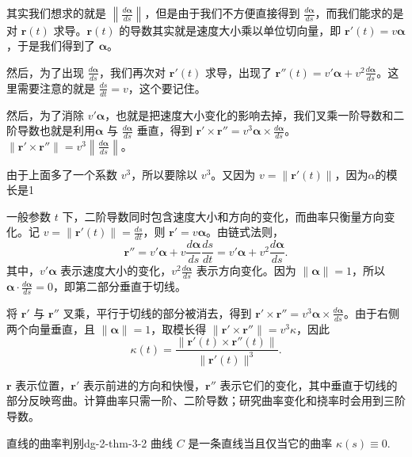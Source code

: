 \begin{dxtips}
   其实我们想求的就是 $\left\|\frac{d\boldsymbol\alpha}{ds}\right\|$，但是由于我们不方便直接得到 $\frac{d\boldsymbol\alpha}{ds}$，而我们能求的是对 $\boldsymbol r(t)$ 求导。$\boldsymbol r(t)$ 的导数其实就是速度大小乘以单位切向量，即 $\boldsymbol r'(t)=v\boldsymbol\alpha$，于是我们得到了 $\boldsymbol\alpha$。

然后，为了出现 $\frac{d\boldsymbol\alpha}{ds}$，我们再次对 $\boldsymbol r'(t)$ 求导，出现了 $\boldsymbol r''(t)=v'\boldsymbol\alpha+v^2\frac{d\boldsymbol\alpha}{ds}$。这里需要注意的就是 $\frac{ds}{dt}=v$，这个要记住。

然后，为了消除 $v'\boldsymbol\alpha$，也就是把速度大小变化的影响去掉，我们叉乘一阶导数和二阶导数也就是利用$\boldsymbol\alpha$ 与 $\frac{d\boldsymbol\alpha}{ds}$ 垂直，得到 $\boldsymbol r'\times\boldsymbol r''=v^3\boldsymbol\alpha\times\frac{d\boldsymbol\alpha}{ds}$。$\|\boldsymbol r'\times\boldsymbol r''\|=v^3\left\|\frac{d\boldsymbol\alpha}{ds}\right\|$。

由于上面多了一个系数 $v^3$，所以要除以 $v^3$。又因为 $v=\|\boldsymbol r'(t)\|$，因为$\alpha$的模长是1
\end{dxtips}
\begin{example}
一般参数 $t$ 下，二阶导数同时包含速度大小和方向的变化，而曲率只衡量方向变化。记 $v=\|\boldsymbol r'(t)\|=\frac{ds}{dt}$，则 $\boldsymbol r'=v\boldsymbol\alpha$。由链式法则，
\[
\boldsymbol r''
=v'\boldsymbol\alpha
+v\frac{d\boldsymbol\alpha}{ds}\frac{ds}{dt}
=v'\boldsymbol\alpha+v^2\frac{d\boldsymbol\alpha}{ds}.
\]
其中，$v'\boldsymbol\alpha$ 表示速度大小的变化，$v^2\frac{d\boldsymbol\alpha}{ds}$ 表示方向变化。因为 $\|\boldsymbol\alpha\|=1$，所以 $\boldsymbol\alpha\cdot\frac{d\boldsymbol\alpha}{ds}=0$，即第二部分垂直于切线。

将 $\boldsymbol r'$ 与 $\boldsymbol r''$ 叉乘，平行于切线的部分被消去，得到 $\boldsymbol r'\times\boldsymbol r''=v^3\boldsymbol\alpha\times\frac{d\boldsymbol\alpha}{ds}$。由于右侧两个向量垂直，且 $\|\boldsymbol\alpha\|=1$，取模长得 $\|\boldsymbol r'\times\boldsymbol r''\|=v^3\kappa$，因此
\[
\kappa(t)=
\frac{\|\boldsymbol r'(t)\times\boldsymbol r''(t)\|}
{\|\boldsymbol r'(t)\|^3}.
\]

$\boldsymbol r$ 表示位置，$\boldsymbol r'$ 表示前进的方向和快慢，$\boldsymbol r''$ 表示它们的变化，其中垂直于切线的部分反映弯曲。计算曲率只需一阶、二阶导数；研究曲率变化和挠率时会用到三阶导数。
\end{example}

\begin{theorem}{直线的曲率判别}{dg-2-thm-3-2}
曲线 \(C\) 是一条直线当且仅当它的曲率 \(\kappa(s) \equiv 0\).
\end{theorem}

